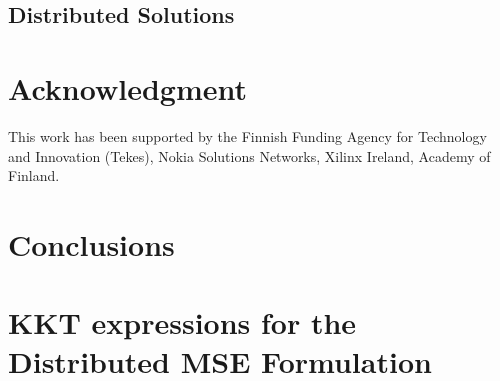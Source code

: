 \documentclass[11pt,draftcls,onecolumn,letterpaper]{./../Styles/IEEEtran}
\begin{document}
\subsection{Distributed Solutions}


\section*{Acknowledgment}
This work has been supported by the Finnish Funding Agency for Technology and Innovation (Tekes), Nokia Solutions Networks, Xilinx Ireland, Academy of Finland.

\acresetall
\section{Conclusions} \label{sec-6}


\appendices

%

\section{\ac{KKT} expressions for the Distributed MSE Formulation} \label{a-1}




\end{document}
